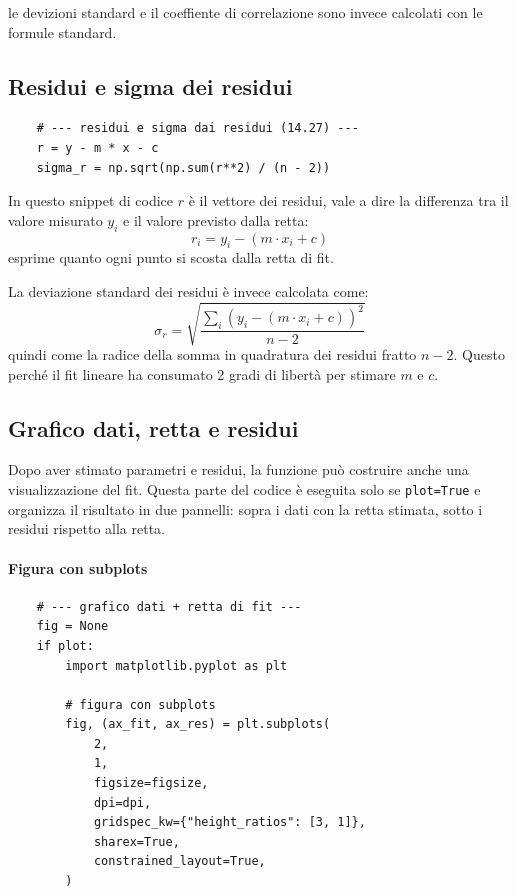 le devizioni standard e il coeffiente di correlazione sono invece calcolati con le formule standard.

\newpage

\subsection{Residui e sigma dei residui}

\begin{verbatim}
    # --- residui e sigma dai residui (14.27) ---
    r = y - m * x - c
    sigma_r = np.sqrt(np.sum(r**2) / (n - 2))    
\end{verbatim}

In questo snippet di codice \(r\) è il vettore dei residui, vale a dire la differenza tra il valore misurato \(y_i\) e il valore previsto dalla retta:
\[
r_i = y_i - (m \cdot x_i + c)
\]
esprime quanto ogni punto si scosta dalla retta di fit. 

La deviazione standard dei residui è invece calcolata come:
\[
\sigma_r = \sqrt{\frac{\sum_i \left(y_i - (m \cdot x_i + c)\right)^2}{n - 2}}
\]
quindi come la radice della somma in quadratura dei residui fratto \(n -2\). Questo perché il fit lineare ha consumato 2 gradi di libertà per stimare \(m\) e \(c\).

\subsection{Grafico dati, retta e residui}

Dopo aver stimato parametri e residui, la funzione può costruire anche una visualizzazione del fit. Questa parte del codice è eseguita solo se \texttt{plot=True} e organizza il risultato in due pannelli: sopra i dati con la retta stimata, sotto i residui rispetto alla retta.

\paragraph{Figura con subplots}
\begin{verbatim}
    # --- grafico dati + retta di fit ---
    fig = None
    if plot:
        import matplotlib.pyplot as plt

        # figura con subplots
        fig, (ax_fit, ax_res) = plt.subplots(
            2,
            1,
            figsize=figsize,
            dpi=dpi,
            gridspec_kw={"height_ratios": [3, 1]},
            sharex=True,
            constrained_layout=True,
        )
\end{verbatim}

